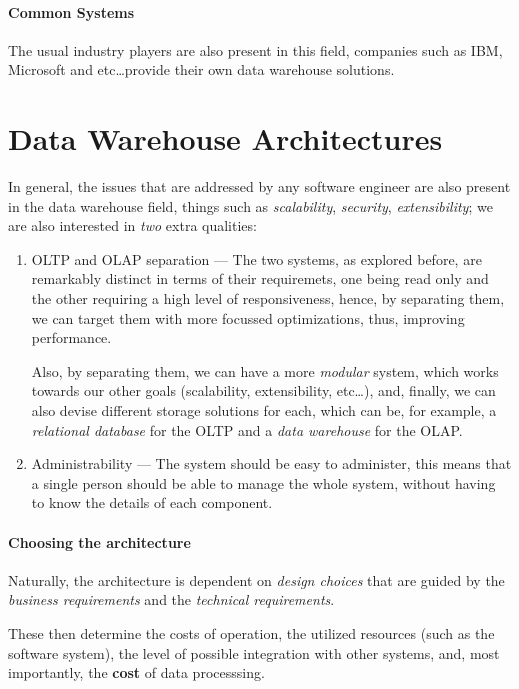\documentclass[openright, twoside, twocolumn, a4paper, 10pt]{report}
\begin{document}
\paragraph{Common Systems}
The usual industry players are also present in this field, companies such as
IBM, Microsoft and etc\dots provide their own data warehouse solutions.

\section{Data Warehouse Architectures}
In general, the issues that are addressed by any software engineer are
also present in the data warehouse field, things such as \emph{scalability},
\emph{security}, \emph{extensibility}; we are also interested in
\emph{two} extra qualities:

\begin{enumerate}
	\item OLTP and OLAP separation --- The two systems, as explored before,
	      are remarkably distinct in terms of their requiremets, one being read only
	      and the other requiring a high level of responsiveness, hence, by separating them,
	      we can target them with more focussed optimizations, thus, improving performance.

	      Also, by separating them, we can have a more \emph{modular} system, which works
	      towards our other goals (scalability, extensibility, etc\dots), and, finally,
	      we can also devise different storage solutions for each, which can be, for example,
	      a \emph{relational database} for the OLTP and a \emph{data warehouse} for the OLAP.\@
	\item Administrability --- The system should be easy to administer, this means that
	      a single person should be able to manage the whole system, without having to
	      know the details of each component.
\end{enumerate}

\paragraph{Choosing the architecture}
Naturally, the architecture is dependent on \emph{design choices} that are
guided by the \emph{business requirements} and the \emph{technical requirements}.

These then determine the costs of operation, the utilized resources (such as
the software system), the level of possible integration with other systems, and,
most importantly, the \textbf{cost} of data processsing.
\end{document}
